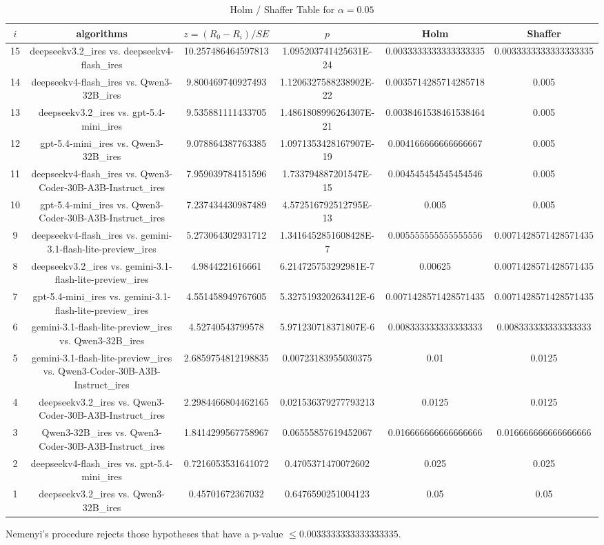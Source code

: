 \documentclass[a4paper,10pt]{article}
\begin{document}
\begin{landscape}
\begin{table}[!htp]
\centering\tiny
\caption{Holm / Shaffer Table for $\alpha=0.05$}
\begin{tabular}{cccccc}
$i$&algorithms&$z=(R_0 - R_i)/SE$&$p$&Holm&Shaffer\\
\hline
15&deepseekv3.2_ires vs. deepseekv4-flash_ires&10.257486464597813&1.095203741425631E-24&0.0033333333333333335&0.0033333333333333335\\14&deepseekv4-flash_ires vs. Qwen3-32B_ires&9.800469740927493&1.1206327588238902E-22&0.0035714285714285718&0.005\\13&deepseekv3.2_ires vs. gpt-5.4-mini_ires&9.535881111433705&1.4861808996264307E-21&0.0038461538461538464&0.005\\12&gpt-5.4-mini_ires vs. Qwen3-32B_ires&9.078864387763385&1.0971353428167907E-19&0.004166666666666667&0.005\\11&deepseekv4-flash_ires vs. Qwen3-Coder-30B-A3B-Instruct_ires&7.959039784151596&1.733794887201547E-15&0.004545454545454546&0.005\\10&gpt-5.4-mini_ires vs. Qwen3-Coder-30B-A3B-Instruct_ires&7.237434430987489&4.572516792512795E-13&0.005&0.005\\9&deepseekv4-flash_ires vs. gemini-3.1-flash-lite-preview_ires&5.273064302931712&1.3416452851608428E-7&0.005555555555555556&0.0071428571428571435\\8&deepseekv3.2_ires vs. gemini-3.1-flash-lite-preview_ires&4.9844221616661&6.214725753292981E-7&0.00625&0.0071428571428571435\\7&gpt-5.4-mini_ires vs. gemini-3.1-flash-lite-preview_ires&4.551458949767605&5.327519320263412E-6&0.0071428571428571435&0.0071428571428571435\\6&gemini-3.1-flash-lite-preview_ires vs. Qwen3-32B_ires&4.52740543799578&5.971230718371807E-6&0.008333333333333333&0.008333333333333333\\5&gemini-3.1-flash-lite-preview_ires vs. Qwen3-Coder-30B-A3B-Instruct_ires&2.6859754812198835&0.00723183955030375&0.01&0.0125\\4&deepseekv3.2_ires vs. Qwen3-Coder-30B-A3B-Instruct_ires&2.2984466804462165&0.021536379277793213&0.0125&0.0125\\3&Qwen3-32B_ires vs. Qwen3-Coder-30B-A3B-Instruct_ires&1.8414299567758967&0.06555857619452067&0.016666666666666666&0.016666666666666666\\2&deepseekv4-flash_ires vs. gpt-5.4-mini_ires&0.7216053531641072&0.4705371470072602&0.025&0.025\\1&deepseekv3.2_ires vs. Qwen3-32B_ires&0.45701672367032&0.6476590251004123&0.05&0.05\\\hline
\end{tabular}
\end{table}
Nemenyi's procedure rejects those hypotheses that have a p-value $\le0.0033333333333333335$.



\end{landscape}
\end{document}
